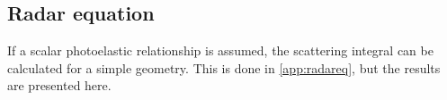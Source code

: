 \documentclass[10pt,a4paper,draft]{scrartcl}
\begin{document}
	\subsection{Radar equation}
	If a scalar photoelastic relationship is assumed, the scattering integral can be calculated for a simple geometry. This is done in \ref{app:radareq}, but the results are presented here.
\end{document}
